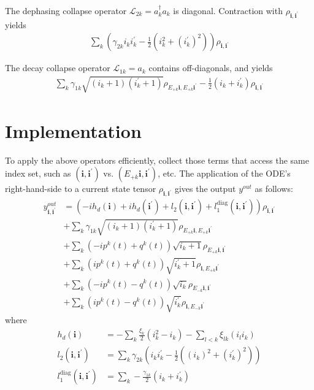 \documentclass[letterpaper]{article}
\newcommand{\Ell}{\mathcal{L}}
\newcommand{\bfi}{\boldsymbol{i}}
\newcommand{\Epk}{E_{+k}}
\newcommand{\Emk}{E_{-k}}
\begin{document}
\begin{enumerate}
    The dephasing collapse operator $\Ell_{2k} = a_k^\dag a_k$ is diagonal. Contraction with $\rho_{\bfi,\bfi^\prime}$ yields
    \begin{align}
        \sum_k \left( \gamma_{2k} i_ki_k^\prime - \frac 12 \left( i_k^2 + (i_k^\prime)^2\right) \right) \rho_{\bfi,\bfi^\prime}
    \end{align}

    The decay collapse operator $\Ell_{1k} = a_k$ contains off-diagonals, and yields
    \begin{align}
        \sum_k \gamma_{1k} \sqrt{(i_k+1)(i_k^\prime+1)} \rho_{E_{+k}\bfi, E_{+k}\bfi^\prime} - \frac 12 \left( i_k+ i_k^\prime \right)\rho_{\bfi, \bfi^\prime} 
    \end{align}
      
\end{enumerate}

\section{Implementation}

  To apply the above operators efficiently, collect those terms that access the same index set, such as $(\bfi,\bfi^\prime)$ vs. $(E_{+k}\bfi, \bfi^\prime)$, etc. The application of the ODE's right-hand-side to a current state tensor $\rho_{\bfi,\bfi^\prime}$ gives the output $y^{out}$ as follows:
  \begin{align} 
       y^{out}_{\bfi,\bfi^\prime}  &= 
       \left(-i h_d(\bfi) + ih_d(\bfi^\prime)
        + l_2(\bfi,\bfi^\prime) + l_1^{\text{diag}}(\bfi, \bfi^\prime) \right) \rho_{\bfi,\bfi^\prime} \\ \label{eq:applyRHS1}
        &+ \sum_k \gamma_{1k} \sqrt{(i_k+1)(i_k^\prime+1)} \rho_{E_{+k}\bfi, E_{+k}\bfi^\prime}\\
        &+ \sum_k \left(-ip^k(t) + q^k(t)\right) \sqrt{i_k+1} \rho_{\Epk \bfi, \bfi^\prime} \\
        &+ \sum_k \left( ip^k(t) + q^k(t)\right) \sqrt{i_k^\prime+1} \rho_{\bfi,\Epk \bfi^\prime} \\
        &+ \sum_k \left(-ip^k(t) - q^k(t)\right) \sqrt{i_k} \rho_{\Emk \bfi, \bfi^\prime} \\
        &+ \sum_k \left( ip^k(t) - q^k(t)\right) \sqrt{i_k^\prime} \rho_{\bfi,\Emk \bfi^\prime}  \label{eq:applyRHS2}
  \end{align}
  where 
  \begin{align}
    h_d(\bfi) &= -\sum_k \frac{\xi_k}{2}(i_k^2 - i_k) - \sum_{l<k} \xi_{lk} (i_l i_k) \\
    l_2(\bfi,\bfi^\prime) &= \sum_k \gamma_{2k} \left(i_ki_k^\prime - \frac 12 \left( (i_k)^2 + (i_k^\prime)^2\right) \right)\\
    l_1^{\text{diag}}(\bfi, \bfi^\prime) &= \sum_k -\frac{\gamma_{1k}}{2}\left(i_k + i_k^\prime\right) 
  \end{align}
\end{document}
